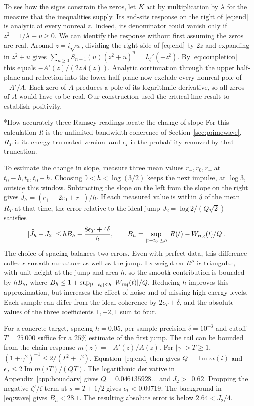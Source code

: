 \documentclass[11pt,letterpaper]{article}
\makeatletter
\renewcommand\subsection{\@startsection{subsection}{2}{\z@}{-2.0ex plus -.3ex}{.75ex}{\normalfont\normalsize\itshape}}
\numberwithin{equation}{section}
\makeatother
\begin{document}
To see how the signs constrain the zeros, let $K$ act by multiplication by $\lambda$ for the measure that the inequalities supply. Its end-site response on the right of \eqref{eq:end} is analytic at every nonreal $z$. Indeed, its denominator could vanish only if $z^2=1/\lambda-u\ge0$. We can identify the response without first assuming the zeros are real. Around $z=i\sqrt u$, dividing the right side of \eqref{eq:end} by $2z$ and expanding in $z^2+u$ gives $\sum_{n\ge0}S_{n+1}(u)(z^2+u)^n=L_\xi'(-z^2)$. By \eqref{eq:completion} this equals $-A'(z)/(2zA(z))$. Analytic continuation through the upper half-plane and reflection into the lower half-plane now exclude every nonreal pole of $-A'/A$. Each zero of $A$ produces a pole of its logarithmic derivative, so all zeros of $A$ would have to be real. Our construction used the critical-line result to establish positivity.

\subsection*{How accurately three Ramsey readings locate the change of slope}
For this calculation $R$ is the unlimited-bandwidth coherence of Section~\ref{sec:primewave}, $R_T$ is its energy-truncated version, and $\epsilon_T$ is the probability removed by that truncation.

To estimate the change in slope, measure three mean values $r_-,r_0,r_+$ at $t_0-h,t_0,t_0+h$. Choosing $0<h<\log(3/2)$ keeps the next impulse, at $\log3$, outside this window. Subtracting the slope on the left from the slope on the right gives $\widehat J_h=(r_+-2r_0+r_-)/h$. If each measured value is within $\delta$ of the mean $R_T$ at that time, the error relative to the ideal jump $J_2=\log 2/(Q\sqrt 2)$ satisfies
\[
 |\widehat J_h-J_2|
 \le h B_h+\frac{8\epsilon_T+4\delta}{h},\qquad
 B_h=\sup_{|t-t_0|\le h}|R(t)-W_{\rm reg}(t)/Q|.
\]
The choice of spacing balances two errors. Even with perfect data, this difference collects smooth curvature as well as the jump. Its weight on $R''$ is triangular, with unit height at the jump and area $h$, so the smooth contribution is bounded by $hB_h$, where $B_h\le1+\sup_{|t-t_0|\le h}|W_{\rm reg}(t)|/Q$. Reducing $h$ improves this approximation, but increases the effect of noise and of missing high-energy levels. Each sample can differ from the ideal coherence by $2\epsilon_T+\delta$, and the absolute values of the three coefficients $1,-2,1$ sum to four.

For a concrete target, spacing $h=0.05$, per-sample precision $\delta=10^{-3}$ and cutoff $T=25\,000$ suffice for a $25\%$ estimate of the first jump. The tail can be bounded from the chain response $m(z)=-A'(z)/A(z)$. For $|\gamma|>T\ge1$, $(1+\gamma^2)^{-1}\le2/(T^2+\gamma^2)$. Equation~\eqref{eq:end} then gives $Q=\operatorname{Im}m(i)$ and $\epsilon_T\le2\operatorname{Im}m(iT)/(QT)$. The logarithmic derivative in Appendix~\ref{app:boundary} gives $Q=0.046135928\ldots$ and $J_2>10.62$. Dropping the negative $\zeta'/\zeta$ term at $s=T+1/2$ gives $\epsilon_T<0.00719$. The background in \eqref{eq:wave} gives $B_h<28.1$. The resulting absolute error is below $2.64<J_2/4$.
\end{document}
